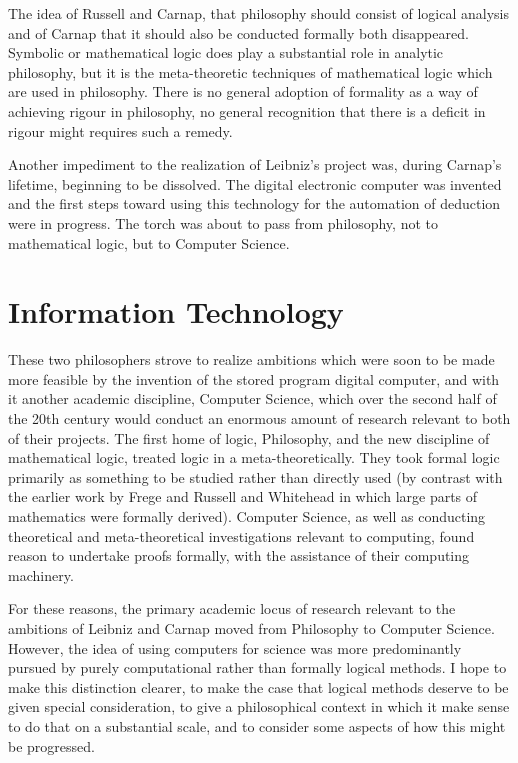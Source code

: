 The idea of Russell and Carnap, that philosophy should consist of
logical analysis and of Carnap that it should also be conducted
formally both disappeared. 
Symbolic or mathematical logic does play a substantial role in
analytic philosophy, but it is the meta-theoretic techniques of
mathematical logic which are used in philosophy. 
There is no general adoption of formality as a way of achieving rigour
in philosophy, no general recognition that there is a deficit in
rigour might requires such a remedy. 

Another impediment to the realization of Leibniz's project was, during
Carnap's lifetime, beginning to be dissolved. 
The digital electronic computer was invented and the first steps
toward using this technology for the automation of deduction were in
progress. 
The torch was about to pass from philosophy, not to mathematical
logic, but to Computer Science. 

\section{Information Technology}

These two philosophers strove to realize ambitions which were soon to
be made more feasible by the invention of the stored program digital
computer, and with it another academic discipline, Computer Science,
which over the second half of the 20th century would conduct an
enormous amount of research relevant to both of their projects.
The first home of logic, Philosophy, and the new discipline of
mathematical logic, treated logic in a meta-theoretically.
They took formal logic primarily as something to be studied rather
than directly used (by contrast with the earlier work by Frege and
Russell and Whitehead in which large parts of mathematics were
formally derived).
Computer Science, as well as conducting theoretical and
meta-theoretical investigations relevant to computing, found reason to
undertake proofs formally, with the assistance of their computing
machinery.

For these reasons, the primary academic locus of research relevant to the
ambitions of Leibniz and Carnap moved from Philosophy to Computer
Science.
However, the idea of using computers for science was more
predominantly pursued by purely computational rather than formally
logical methods.
I hope to make this distinction clearer, to make the case that
logical methods deserve to be given special consideration, to give a
philosophical context in which it make sense to do that on a
substantial scale, and to consider some aspects of how this might be progressed.

